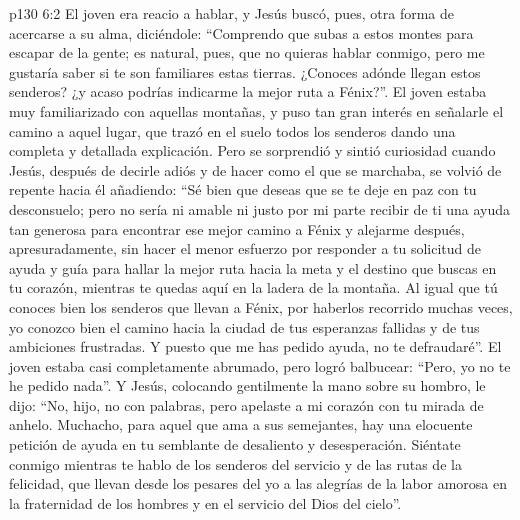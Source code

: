 \vs p130 6:2 El joven era reacio a hablar, y Jesús buscó, pues, otra forma de acercarse a su alma, diciéndole: “Comprendo que subas a estos montes para escapar de la gente; es natural, pues, que no quieras hablar conmigo, pero me gustaría saber si te son familiares estas tierras. ¿Conoces adónde llegan estos senderos? ¿y acaso podrías indicarme la mejor ruta a Fénix?”. El joven estaba muy familiarizado con aquellas montañas, y puso tan gran interés en señalarle el camino a aquel lugar, que trazó en el suelo todos los senderos dando una completa y detallada explicación. Pero se sorprendió y sintió curiosidad cuando Jesús, después de decirle adiós y de hacer como el que se marchaba, se volvió de repente hacia él añadiendo: “Sé bien que deseas que se te deje en paz con tu desconsuelo; pero no sería ni amable ni justo por mi parte recibir de ti una ayuda tan generosa para encontrar ese mejor camino a Fénix y alejarme después, apresuradamente, sin hacer el menor esfuerzo por responder a tu solicitud de ayuda y guía para hallar la mejor ruta hacia la meta y el destino que buscas en tu corazón, mientras te quedas aquí en la ladera de la montaña. Al igual que tú conoces bien los senderos que llevan a Fénix, por haberlos recorrido muchas veces, yo conozco bien el camino hacia la ciudad de tus esperanzas fallidas y de tus ambiciones frustradas. Y puesto que me has pedido ayuda, no te defraudaré”. El joven estaba casi completamente abrumado, pero logró balbucear: “Pero, yo no te he pedido nada”. Y Jesús, colocando gentilmente la mano sobre su hombro, le dijo: “No, hijo, no con palabras, pero apelaste a mi corazón con tu mirada de anhelo. Muchacho, para aquel que ama a sus semejantes, hay una elocuente petición de ayuda en tu semblante de desaliento y desesperación. Siéntate conmigo mientras te hablo de los senderos del servicio y de las rutas de la felicidad, que llevan desde los pesares del yo a las alegrías de la labor amorosa en la fraternidad de los hombres y en el servicio del Dios del cielo”.
